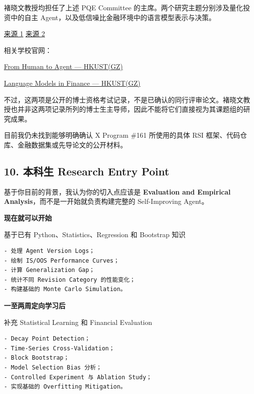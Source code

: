 褚晓文教授均担任了上述 PQE Committee 的主席。两个研究主题分别涉及量化投资中的自主 Agent，以及低信噪比金融环境中的语言模型表示与决策。

\href{https://dsa.hkust-gz.edu.cn/zh/blog/2026/05/29/language-models-in-finance-representation-abstraction-and-policy-learning/}{来源 1} \href{https://dsa.hkust-gz.edu.cn/zh/blog/2025/06/09/from-human-to-agenta-survey-of-deep-learning-inquantitative-investment/}{来源 2}

相关学校官网：

\href{https://dsa.hkust-gz.edu.cn/zh/blog/2025/06/09/from-human-to-agenta-survey-of-deep-learning-inquantitative-investment/}{From Human to Agent --- HKUST(GZ)}

\href{https://dsa.hkust-gz.edu.cn/zh/blog/2026/05/29/language-models-in-finance-representation-abstraction-and-policy-learning/}{Language Models in Finance --- HKUST(GZ)}

不过，这两项是公开的博士资格考试记录，不是已确认的同行评审论文。褚晓文教授也并非这两项记录所列的博士生主导师，因此不能将它们直接视为其课题组的研究成果。

目前我仍未找到能够明确确认 X Program \#161 所使用的具体 RSI 框架、代码仓库、金融数据集或先导论文的公开材料。

\hypertarget{part-1-07-0001-ux672cux79d1ux751f-research-entry-point}{%
\subsection{10. 本科生 Research Entry Point}\label{part-1-07-0001-ux672cux79d1ux751f-research-entry-point}}

基于你目前的背景，我认为你的切入点应该是 \textbf{Evaluation and Empirical Analysis}，而不是一开始就负责构建完整的 Self-Improving Agent。

\textbf{现在就可以开始}

基于已有 Python、Statistics、Regression 和 Bootstrap 知识

\begin{verbatim}
- 处理 Agent Version Logs；
- 绘制 IS/OOS Performance Curves；
- 计算 Generalization Gap；
- 统计不同 Revision Category 的性能变化；
- 构建基础的 Monte Carlo Simulation。
\end{verbatim}

\textbf{一至两周定向学习后}

补充 Statistical Learning 和 Financial Evaluation

\begin{verbatim}
- Decay Point Detection；
- Time-Series Cross-Validation；
- Block Bootstrap；
- Model Selection Bias 分析；
- Controlled Experiment 与 Ablation Study；
- 实现基础的 Overfitting Mitigation。
\end{verbatim}


